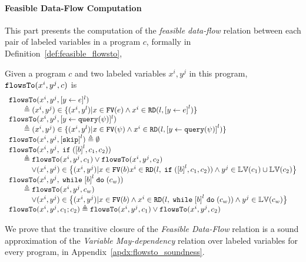 \paragraph{Feasible Data-Flow Computation}
This part presents the computation of the \emph{feasible data-flow} relation between each pair of labeled variables in a program $c$,
formally in Definition~\ref{def:feasible_flowsto}, 
%
%
\begin{defn}
 \label{def:feasible_flowsto}
 Given a program $c$ and two labeled variables $x^i, y^j$ in this program, 
 $\mathtt{flowsTo}(x^i, y^j, c)$ is 
 \[
 \begin{array}{l}
 \flowsto(x^i, y^j, \clabel{\assign{y}{\expr}}{}^l) 
 \\ \qquad \triangleq (x^i, y^j) \in \{ (x^i, y^l) | x \in \kw{FV}(\expr) 
 \land x^i \in \live(l, \clabel{\assign{y}{\expr}}^l) \} \\
 \flowsto(x^i, y^j, \clabel{\assign{y}{\query(\qexpr)}}{}^l) 
 \\ \qquad \triangleq (x^i, y^j) \in \{ (x^i, y^l) | x \in \kw{FV}(\qexpr) 
 \land x^i \in \live(l,\clabel{\assign{y}{\query(\qexpr)}}^l) \} \\
 \flowsto(x^i, y^j, \clabel{\eskip}^{l}) 
 \triangleq \emptyset \\
 \flowsto(x^i, y^j, \eif (\clabel{\bexpr}^{l}, c_1, c_2)) 
 \\ \qquad \triangleq \flowsto(x^i, y^j, c_1) \lor \flowsto(x^i, y^j, c_2) 
 \\ \qquad \quad \lor (x^i, y^j) \in \big\{(x^i,y^j) | x \in \kw{FV}(b) 
 x^i \in \live(l, \eif (\clabel{\bexpr}^{l}, c_1, c_2)) \land y^j \in \lvar(c_1)\cup \lvar(c_2) \big\}
 \\
 \flowsto(x^i, y^j, \ewhile \clabel{\bexpr}^{l} \edo (c_w)) 
 \\ \qquad \triangleq \flowsto(x^i, y^j, c_w) 
 \\ \qquad \quad \lor
 (x^i, y^j) \in \big\{(x^i,y^j) | x \in \kw{FV}(b) 
 \land x^i \in \live(l, \ewhile \clabel{\bexpr}^{l} \edo (c_w)) \land y^j \in \lvar(c_w) \big\} 
 \\
 \flowsto(x^i, y^j, c_1 ;c_2) 
 \triangleq \flowsto(x^i, y^j, c_1) \lor \flowsto(x^i, y^j, c_2) \\
 \end{array}
 \]
 \end{defn}
%
We prove that the transitive closure of the \emph{Feasible Data-Flow} relation is a sound approximation 
of the \emph{Variable May-dependency} relation over labeled variables for every program,
in Appendix~\ref{apdx:flowsto_soundness}.
%

